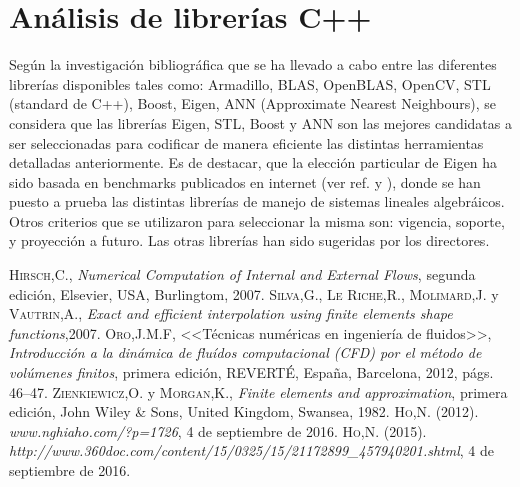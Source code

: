 \section{Análisis de librerías C++}

	Según la investigación bibliográfica que se ha llevado a cabo entre las diferentes librerías disponibles tales como: Armadillo, BLAS, OpenBLAS, OpenCV, STL (standard de C++), Boost, Eigen, ANN (Approximate Nearest Neighbours), se considera que las librerías Eigen, STL, Boost y ANN son las mejores candidatas a ser seleccionadas para codificar de manera eficiente las distintas herramientas detalladas anteriormente. Es de destacar, que la elección particular de Eigen ha sido basada en benchmarks publicados en internet (ver ref. \cite{chino} y \cite{chino2}), donde se han puesto a prueba las distintas librerías de manejo de sistemas lineales algebráicos. Otros criterios que se utilizaron para seleccionar la misma son: vigencia, soporte, y proyección a futuro. Las otras librerías han sido sugeridas por los directores.


\begin{thebibliography}{X}
 \textsc{Hirsch,C.},
\textit{Numerical Computation of Internal and External Flows}, segunda edición,
Elsevier, USA, Burlingtom, 2007.
 \textsc{Silva,G.}, \textsc{Le Riche,R.}, \textsc{Molimard,J.} y \textsc{Vautrin,A.},
\textit{Exact and efficient interpolation using finite elements shape functions},2007.
 \textsc{Oro,J.M.F},
<<Técnicas numéricas en ingeniería de fluidos>>,
\textit{Introducción a la dinámica de fluídos computacional (CFD) por el método de volúmenes finitos}, primera edición, REVERTÉ, España, Barcelona, 2012, págs. 46--47.
 \textsc{Zienkiewicz,O.} y \textsc{Morgan,K.}, 
\textit{Finite elements and approximation}, primera edición, John Wiley \& Sons, United Kingdom, Swansea, 1982.
 \textsc{Ho,N.} (2012).
\textit{www.nghiaho.com/?p=1726}, 4 de septiembre de 2016.
 \textsc{Ho,N.} (2015).
\textit{http://www.360doc.com/content/15/0325/15/21172899\_457940201.shtml}, 4 de septiembre de 2016.

\end{thebibliography}


